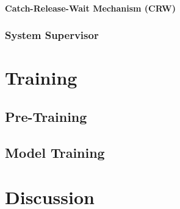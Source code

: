 \documentclass{article}
\begin{document}

                \paragraph{Catch-Release-Wait Mechanism (CRW)}

            \subsubsection{System Supervisor}

	\section{Training}

        \subsection{Pre-Training}

        \subsection{Model Training}

	\section{Discussion}
\end{document}
